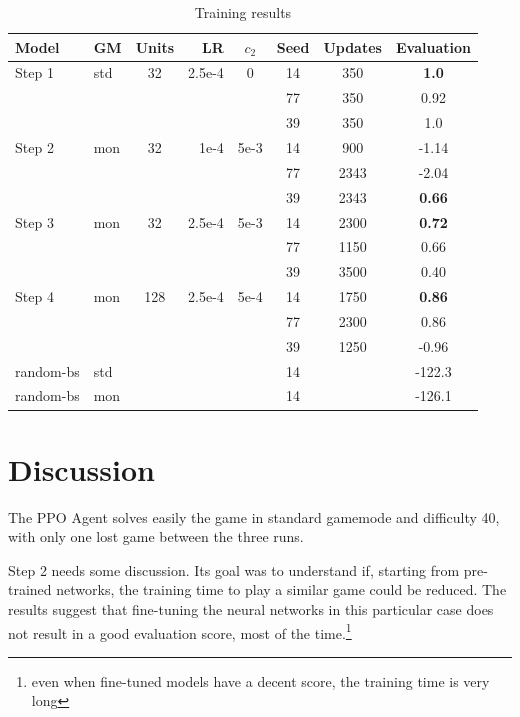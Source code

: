 \documentclass{article}
\begin{document}
\begin{table}
  \caption{Training results}
  \label{results}
  \centering
  \begin{tabular}{llcrcccc}
    \toprule
    Model & GM & Units & LR & \(c_2\) & Seed & Updates & Evaluation\\
    \midrule
    Step 1  & std & 32  & 2.5e-4  & 0 & 14 & 350 & \textbf{1.0} \\
    & & & & & 77 & 350 & 0.92 \\
    & & & & & 39 & 350 & 1.0 \\
    \midrule
    Step 2  & mon & 32  & 1e-4   & 5e-3 & 14 & 900 & -1.14\\
    & & & & & 77 & 2343 & -2.04 \\
    & & & & & 39 & 2343 & \textbf{0.66} \\
    \midrule
    Step 3  & mon & 32  & 2.5e-4  & 5e-3 & 14 & 2300 & \textbf{0.72}\\
    & & & & & 77 & 1150 & 0.66 \\
    & & & & & 39 & 3500 & 0.40 \\
    \midrule
    Step 4  & mon & 128 & 2.5e-4  & 5e-4 & 14 & 1750 & \textbf{0.86}\\
    & & & & & 77 & 2300 & 0.86 \\
    & & & & & 39 & 1250 & -0.96 \\
    \midrule
    random-bs  
            & std & & & & 14 & & -122.3 \\
    random-bs
            & mon & & & & 14 & & -126.1 \\
    
    \bottomrule
  \end{tabular}
\end{table}

\section{Discussion}

The PPO Agent solves easily the game in standard gamemode and difficulty 40, with only one lost game between the three runs. 

Step 2 needs some discussion. Its goal was to understand if, starting from pre-trained networks, the training time to play a similar game could be reduced. The results suggest that fine-tuning the neural networks in this particular case does not result in a good evaluation score, most of the time.\footnote{even when fine-tuned models have a decent score, the training time is very long} 
\end{document}
